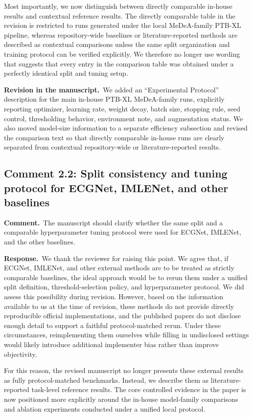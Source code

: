 \documentclass[11pt]{article}
\newcommand{\commentheader}{\textbf{Comment.}}
\newcommand{\responseheader}{\textbf{Response.}}
\newcommand{\revisionheader}{\textbf{Revision in the manuscript.}}
\begin{document}
Most importantly, we now distinguish between directly comparable in-house results and contextual reference results. The directly comparable table in the revision is restricted to runs generated under the local MeDeA-family PTB-XL pipeline, whereas repository-wide baselines or literature-reported methods are described as contextual comparisons unless the same split organization and training protocol can be verified explicitly. We therefore no longer use wording that suggests that every entry in the comparison table was obtained under a perfectly identical split and tuning setup.

\revisionheader\ We added an ``Experimental Protocol'' description for the main in-house PTB-XL MeDeA-family runs, explicitly reporting optimizer, learning rate, weight decay, batch size, stopping rule, seed control, thresholding behavior, environment note, and augmentation status. We also moved model-size information to a separate efficiency subsection and revised the comparison text so that directly comparable in-house runs are clearly separated from contextual repository-wide or literature-reported results.

\subsection*{Comment 2.2: Split consistency and tuning protocol for ECGNet, IMLENet, and other baselines}

\commentheader\ The manuscript should clarify whether the same split and a comparable hyperparameter tuning protocol were used for ECGNet, IMLENet, and the other baselines.

\responseheader\ We thank the reviewer for raising this point. We agree that, if ECGNet, IMLENet, and other external methods are to be treated as strictly comparable baselines, the ideal approach would be to rerun them under a unified split definition, threshold-selection policy, and hyperparameter protocol. We did assess this possibility during revision. However, based on the information available to us at the time of revision, these methods do not provide directly reproducible official implementations, and the published papers do not disclose enough detail to support a faithful protocol-matched rerun. Under these circumstances, reimplementing them ourselves while filling in undisclosed settings would likely introduce additional implementer bias rather than improve objectivity.

For this reason, the revised manuscript no longer presents these external results as fully protocol-matched benchmarks. Instead, we describe them as literature-reported task-level reference results. The core controlled evidence in the paper is now positioned more explicitly around the in-house model-family comparisons and ablation experiments conducted under a unified local protocol.
\end{document}
